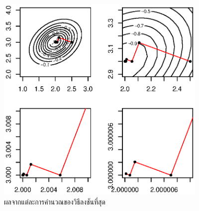 %
%



%
\begin{figure}
\begin{center}
\includegraphics[width=4.0in, height=4.0in]
{02Background/steepestdescentZigZag.eps}
\end{center}
\caption{ผลจากแต่ละการคำนวณของวิธีลงชันที่สุด}
\label{fig: steepest descent zig zag}
\end{figure}



